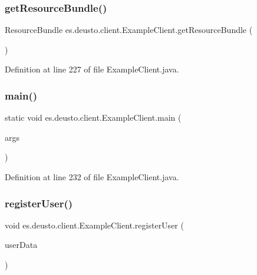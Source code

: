 \subsubsection{\texorpdfstring{get\+Resource\+Bundle()}{getResourceBundle()}}
{\footnotesize\ttfamily Resource\+Bundle es.\+deusto.\+client.\+Example\+Client.\+get\+Resource\+Bundle (\begin{DoxyParamCaption}{ }\end{DoxyParamCaption})}



Definition at line 227 of file Example\+Client.\+java.

\mbox{\label{classes_1_1deusto_1_1client_1_1_example_client_a9eadbc017db92b83cad1f6b72c10bae2}} 
\subsubsection{\texorpdfstring{main()}{main()}}
{\footnotesize\ttfamily static void es.\+deusto.\+client.\+Example\+Client.\+main (\begin{DoxyParamCaption}\item[{String \mbox{[}$\,$\mbox{]}}]{args }\end{DoxyParamCaption})\hspace{0.3cm}{\ttfamily [static]}}



Definition at line 232 of file Example\+Client.\+java.

\mbox{\label{classes_1_1deusto_1_1client_1_1_example_client_a1c17371c17dde2b7664f2ad17ee79e4b}} 
\subsubsection{\texorpdfstring{register\+User()}{registerUser()}}
{\footnotesize\ttfamily void es.\+deusto.\+client.\+Example\+Client.\+register\+User (\begin{DoxyParamCaption}\item[{\hyperlink{classes_1_1deusto_1_1serialization_1_1_user_data}{User\+Data}}]{user\+Data }\end{DoxyParamCaption})}

